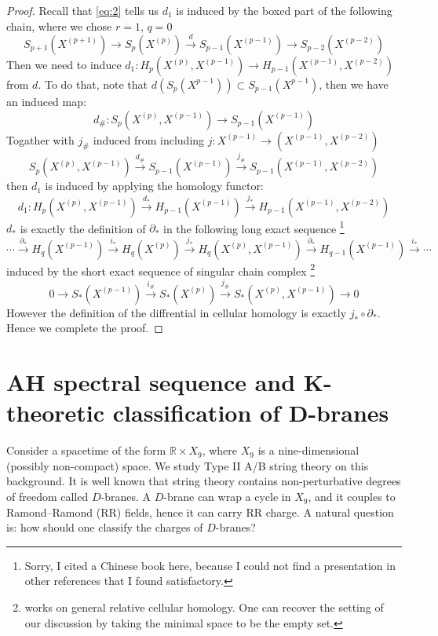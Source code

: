 \documentclass[a4paper,11pt]{article}
\theoremstyle{definition}
\theoremstyle{remark}
\begin{document}
\begin{proof}
Recall that \eqref{eq:2} tells us $d_1$ is induced by the boxed part of the following chain, where we chose $r=1$, $q=0$
\begin{equation}
	S_{p+1}(X^{(p+1)})\to \boxed{
	S_{p}(X^{(p)})\xrightarrow{d}S_{p-1}(X^{(p-1)})
	}\to S_{p-2}(X^{(p-2)})
\end{equation}
Then we need to induce $d_1: H_p(X^{(p)},X^{(p-1)})\to H_{p-1}(X^{(p-1)},X^{(p-2)})$ from $d$. To do that, note that $d(S_p(X^{p-1}))\subset S_{p-1}(X^{p-1})$, then we have an induced map:
\[
d_\# :S_p(X^{(p)},X^{(p-1)})\to S_{p-1}(X^{(p-1)})
\]
Togather with $j_\#$ induced from including $j:X^{(p-1)}\to (X^{(p-1)},X^{(p-2)})$
\[
S_p(X^{(p)},X^{(p-1)})\xrightarrow{d_\#}S_{p-1}(X^{(p-1)})\xrightarrow{j_\#} S_{p-1}(X^{(p-1)},X^{(p-2)})
\]
then $d_1$ is induced by applying the homology functor:
\[
d_1:H_p(X^{(p)},X^{(p-1)})\xrightarrow{d_*}H_{p-1}(X^{(p-1)})\xrightarrow{j_*} H_{p-1}(X^{(p-1)},X^{(p-2)})
\]
$d_*$ is exactly the definition of $\partial_*$ in the following long exact sequence \cite[\S2 注记 1.4]{jiang}\footnote{Sorry, I cited a Chinese book here, because I could not find a presentation in other references that I found satisfactory.}
\[
\cdots\overset{\partial_*}{\operatorname*{\operatorname*{\longrightarrow}}}H_q(X^{(p-1)})\overset{i_*}{\operatorname*{\operatorname*{\longrightarrow}}}H_q(X^{(p)})\overset{j_*}{\operatorname*{\operatorname*{\longrightarrow}}}H_q(X^{(p)},X^{(p-1)})\overset{\partial_*}{\operatorname*{\operatorname*{\longrightarrow}}}H_{q-1}(X^{(p-1)})\overset{i_*}{\operatorname*{\operatorname*{\longrightarrow}}}\cdots
\]
induced by the short exact sequence of singular chain complex \cite[\S 定理 1.11]{jiang}\footnote{\cite{jiang} works on general relative cellular homology. One can recover the setting of our discussion by taking the minimal space to be the empty set.}
\[
0\longrightarrow S_*(X^{(p-1)})\xrightarrow{i_\#}S_*(X^{(p)})\xrightarrow{j_\#}S_*(X^{(p)},X^{(p-1)})\longrightarrow0
\]
However the definition of the diffrential in cellular homology is exactly $j_*\circ \partial_*$. \cite[\S3 命题2.3]{jiang} Hence we complete the proof.
\end{proof}

\section{AH spectral sequence and K-theoretic classification of D-branes}
\label{sec:AHSS}
Consider a spacetime of the form $\mathbb{R}\times X_9$, where $X_9$ is a nine-dimensional (possibly non-compact) space. We study Type II A/B string theory on this background. It is well known that string theory contains non-perturbative degrees of freedom called $D$-branes. A $D$-brane can wrap a cycle in $X_9$, and it couples to Ramond–Ramond (RR) fields, hence it can carry RR charge. A natural question is: how should one classify the charges of $D$-branes?
\end{document}
